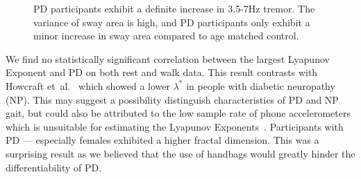 \documentclass[12pt, twoside]{book}
\begin{document}
\begin{figure}[h]
\begin{subfigure}{.42\textwidth}
	\end{subfigure}
	\caption{PD participants exhibit a definite increase in 3.5-7Hz tremor. The variance of sway area is high, and PD participants only exhibit a minor increase in sway area compared to age matched control. }
	\label{basicrest}
\end{figure}

We find no statistically significant correlation between the largest Lyapunov Exponent and PD on both rest and walk data. This result contrasts with Howcraft et~al.~\cite{howcroft2014analysisgaitlyapunov} which showed a lower $\lambda^*$ in people with diabetic neuropathy (NP). This may suggest a possibility distinguish characteristics of PD and NP gait, but could also be attributed to the low sample rate of phone accelerometers which is unsuitable for estimating the Lyapunov Exponents~\cite{rosenstein1993practicallyapunov}. Participants with PD --- especially females exhibited a higher fractal dimension. This was a surprising result as we believed that the use of handbags would greatly hinder the differentiability of PD.
\end{document}
